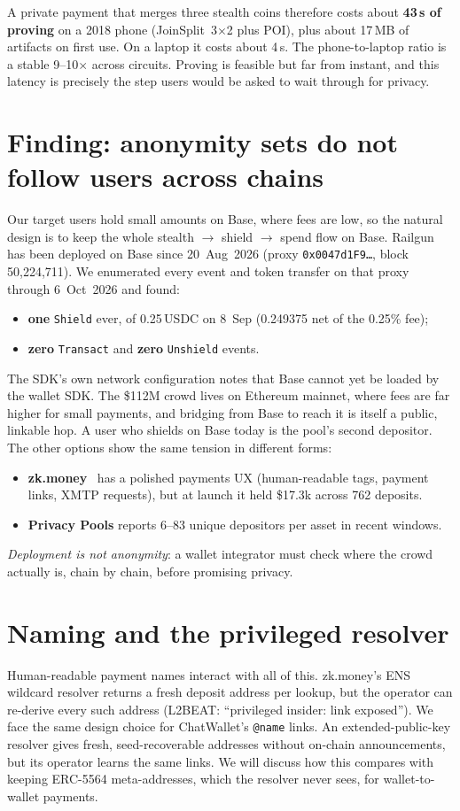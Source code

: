 \documentclass[10pt]{article}
\begin{document}
A private payment that merges three stealth coins therefore costs about \textbf{43\,s of
proving} on a 2018 phone (JoinSplit~3$\times$2 plus POI), plus about 17\,MB of artifacts on
first use. On a laptop it costs about 4\,s. The phone-to-laptop ratio is a stable
9--10$\times$ across circuits. Proving is feasible but far from instant, and this latency is
precisely the step users would be asked to wait through for privacy.

\section*{Finding: anonymity sets do not follow users across chains}
Our target users hold small amounts on Base, where fees are low, so the natural design is to keep
the whole stealth $\rightarrow$ shield $\rightarrow$ spend flow on Base. Railgun has been
deployed on Base since 20~Aug~2026 (proxy \texttt{0x0047d1F9\ldots}, block 50{,}224{,}711).
We enumerated every event and token transfer on that proxy through 6~Oct~2026 and found:
\begin{itemize}\setlength\itemsep{0em}
\item \textbf{one} \texttt{Shield} ever, of 0.25\,USDC on 8~Sep (0.249375 net of the 0.25\% fee);
\item \textbf{zero} \texttt{Transact} and \textbf{zero} \texttt{Unshield} events.
\end{itemize}
The SDK's own network configuration notes that Base cannot yet be loaded by the wallet SDK.
The \$112M crowd lives on Ethereum mainnet, where fees are far higher for small payments, and bridging from Base to reach it is itself a public, linkable
hop. A user who shields on Base today is the pool's second depositor. The other options
show the same tension in different forms:
\begin{itemize}\setlength\itemsep{0em}
\item \textbf{zk.money}~\cite{zkmoney} has a polished payments UX (human-readable tags, payment links, XMTP requests), but at launch it held \$17.3k across 762 deposits.
\item \textbf{Privacy Pools} reports 6--83 unique depositors per asset in recent windows.
\end{itemize}
\emph{Deployment is not anonymity}: a wallet integrator must check where the crowd
actually is, chain by chain, before promising privacy.

\section*{Naming and the privileged resolver}
Human-readable payment names interact with all of this. zk.money's ENS wildcard resolver
returns a fresh deposit address per lookup, but the operator can re-derive every such
address (L2BEAT: ``privileged insider: link exposed''). We face the same design choice for
ChatWallet's \texttt{@name} links. An extended-public-key resolver gives fresh, seed-recoverable
addresses without on-chain announcements, but its operator learns the same links. We will
discuss how this compares with keeping ERC-5564 meta-addresses, which the resolver never
sees, for wallet-to-wallet payments.
\end{document}

